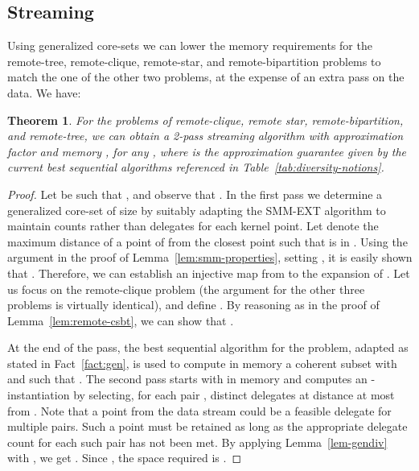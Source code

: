 \documentclass{article}
\newtheorem{theorem}{Theorem}
\begin{document}
\subsection{Streaming}
Using generalized core-sets we can lower the memory requirements for
the  remote-tree, remote-clique, remote-star, and remote-bipartition
problems to match the one of the other two problems, at the expense of
an extra pass on the data. We have:
\begin{theorem}\label{thm-2-pass-gen}
  For the problems of remote-clique, remote star, remote-bipartition,
  and remote-tree, we can obtain a 2-pass streaming algorithm with
  approximation factor  and memory
  , for any , where
   is the approximation guarantee given by the current best
  sequential algorithms referenced in
  Table~\ref{tab:diversity-notions}.
\end{theorem}
\begin{proof}
Let  be such that , and observe that . In the first pass we determine a generalized
core-set  of size  by
suitably adapting the {\sc SMM-EXT} algorithm to maintain counts
rather than delegates for each kernel point. Let  denote the
maximum distance of a point of  from the closest point  such
that  is in .  Using the argument in the proof of
Lemma~\ref{lem:smm-properties}, setting , it is easily shown that . Therefore, we can establish an
injective map  from  to the expansion  of
. Let us focus on the remote-clique problem (the argument for the
other three problems is virtually identical), and define . By reasoning as in the proof of
Lemma~\ref{lem:remote-csbt}, we can show that .

At the end of the pass, the best sequential algorithm for the problem,
adapted as stated in Fact~\ref{fact:gen}, is used to compute in memory
a coherent subset  with  and
such that
.  The second pass
starts with  in memory and computes an -instantiation
 by selecting, for each pair , 
distinct delegates at distance at most
 from .  Note that
a point from the data stream could be a feasible delegate for multiple
pairs. Such a point must be retained as long as the appropriate
delegate count for each such pair has not been met.  By applying
Lemma~\ref{lem-gendiv} with ,
we get .
Since , the space required is
.
\end{proof}
\end{document}

